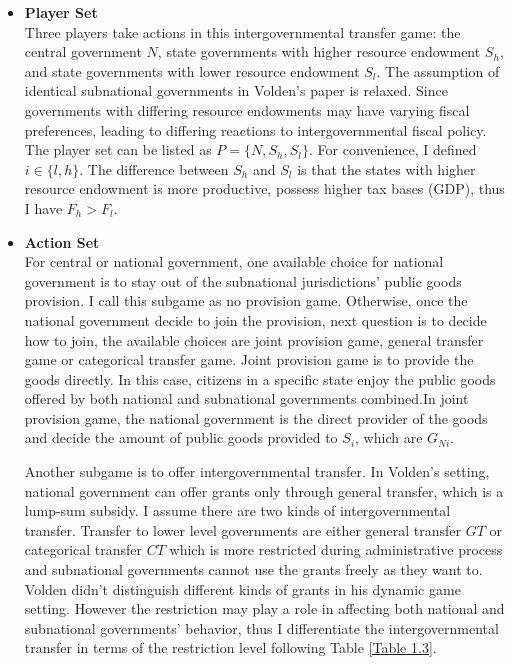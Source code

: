 \begin{itemize}
\item \textbf{Player Set}\\
Three players take actions in this intergovernmental transfer game: the central government $N$, state governments with higher resource endowment $S_h$, and state governments with lower resource endowment $S_l$. The assumption of identical subnational governments in Volden's paper is relaxed. Since governments with differing resource endowments may have varying fiscal preferences, leading to differing reactions to intergovernmental fiscal policy. The player set can be listed as $P = \{ N, S_h, S_l\}$. For convenience, I defined $i\in \{l,h\}$. \label{player} The difference between $S_h$ and $S_l$ is that the states with higher resource endowment is more productive, possess higher tax bases (GDP), thus I have $F_h>F_l$\label{GDP}.

\item \textbf{Action Set}\\
For central or national government, one available choice for national government is to stay out of the subnational jurisdictions' public goods provision. I call this subgame as no provision game. Otherwise, once the national government decide to join the provision, next question is to decide how to join, the available choices are joint provision game, general transfer game or categorical transfer game. Joint provision game is to provide the goods directly. In this case, citizens in a specific state enjoy the public goods offered by both national and subnational governments combined.In joint provision game, the national government is the direct provider of the goods and decide the amount of public goods provided to $S_i$, which are $G_{Ni}$.

Another subgame is to offer intergovernmental transfer. In Volden's setting, national government can offer grants only through general transfer, which is a lump-sum subsidy. I assume there are two kinds of intergovernmental transfer. Transfer to lower level governments are either general transfer $GT$ or categorical transfer $CT$ which is more restricted during administrative process and subnational governments cannot use the grants freely as they want to. \label{transfer} Volden didn't distinguish different kinds of grants in his dynamic game setting. However the restriction may play a role in affecting both national and subnational governments' behavior, thus I differentiate the intergovernmental transfer in terms of the restriction level following Table \ref{Table 1.3}.


\end{itemize}
